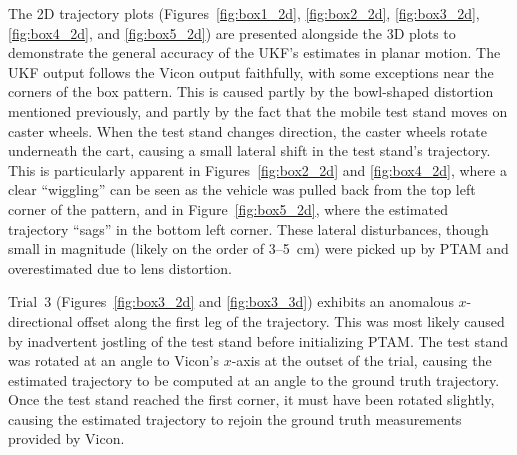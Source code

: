 The 2D trajectory plots (Figures~\ref{fig:box1_2d}, \ref{fig:box2_2d}, \ref{fig:box3_2d}, \ref{fig:box4_2d}, and \ref{fig:box5_2d}) are presented alongside the 3D plots to demonstrate the general accuracy of the UKF's estimates in planar motion. The UKF output follows the Vicon output faithfully, with some exceptions near the corners of the box pattern. This is caused partly by the bowl-shaped distortion mentioned previously, and partly by the fact that the mobile test stand moves on caster wheels. When the test stand changes direction, the caster wheels rotate underneath the cart, causing a small lateral shift in the test stand's trajectory. This is particularly apparent in Figures~\ref{fig:box2_2d} and \ref{fig:box4_2d}, where a clear ``wiggling'' can be seen as the vehicle was pulled back from the top left corner of the pattern, and in Figure~\ref{fig:box5_2d}, where the estimated trajectory ``sags'' in the bottom left corner. These lateral disturbances, though small in magnitude (likely on the order of 3--5~cm) were picked up by PTAM and overestimated due to lens distortion.

Trial~3 (Figures~\ref{fig:box3_2d} and \ref{fig:box3_3d}) exhibits an anomalous $x$-directional offset along the first leg of the trajectory. This was most likely caused by inadvertent jostling of the test stand before initializing PTAM. The test stand was rotated at an angle to Vicon's $x$-axis at the outset of the trial, causing the estimated trajectory to be computed at an angle to the ground truth trajectory. Once the test stand reached the first corner, it must have been rotated slightly, causing the estimated trajectory to rejoin the ground truth measurements provided by Vicon.

\clearpage

